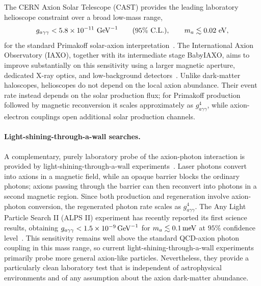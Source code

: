 \documentclass[review]{elsarticle}
\numberwithin{equation}{section}
\numberwithin{table}{section}
\numberwithin{figure}{section}
\begin{document}
The CERN Axion Solar Telescope (CAST) provides the leading laboratory helioscope constraint over a broad low-mass range,
\begin{align}
    g_{a\gamma\gamma}
    <
    5.8\times 10^{-11}\ {\rm GeV}^{-1}
    \qquad
    (95\%~{\rm C.L.}),
    \qquad
    m_a\lesssim 0.02\ {\rm eV},
    \label{eq:cast-axion-photon-bound}
\end{align}
for the standard Primakoff solar-axion interpretation~\cite{CAST:2024eil}. The International Axion Observatory (IAXO), together with its intermediate stage BabyIAXO, aims to improve substantially on this sensitivity using a larger magnetic aperture, dedicated X-ray optics, and low-background detectors~\cite{IAXO:2019mpb,IAXO:2025ltd}. Unlike dark-matter haloscopes, helioscopes do not depend on the local axion abundance. Their event rate instead depends on the solar production flux; for Primakoff production followed by magnetic reconversion it scales approximately as $g_{a\gamma\gamma}^4$, while axion-electron couplings open additional solar production channels.

\paragraph{Light-shining-through-a-wall searches.}

A complementary, purely laboratory probe of the axion-photon interaction is provided by light-shining-through-a-wall experiments~\cite{Redondo:2010dp,Irastorza:2018dyq}. Laser photons convert into axions in a magnetic field, while an opaque barrier blocks the ordinary photons; axions passing through the barrier can then reconvert into photons in a second magnetic region. Since both production and regeneration involve axion-photon conversion, the regenerated photon rate scales as $g_{a\gamma\gamma}^4$. The Any Light Particle Search II (ALPS II) experiment has recently reported its first science results, obtaining
$g_{a\gamma\gamma}<1.5\times10^{-9}\,{\rm GeV}^{-1}$ for $m_a\lesssim0.1\,{\rm meV}$ at $95\%$ confidence level~\cite{ALPSII:2025eri}. This sensitivity remains well above the standard QCD-axion photon coupling in this mass range, so current light-shining-through-a-wall experiments primarily probe more general axion-like particles. Nevertheless, they provide a particularly clean laboratory test that is independent of astrophysical environments and of any assumption about the axion dark-matter abundance.
\end{document}
